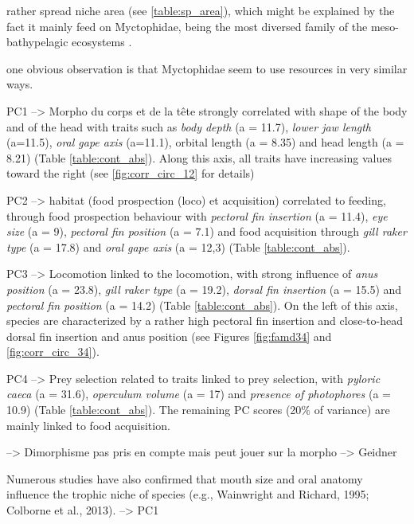 rather spread niche area (see \ref{table:sp_area}), which might be explained by the fact it mainly feed on Myctophidae, being the most diversed family of the meso- bathypelagic ecosystems \citep{garcia2021,sutton1996}.


one obvious observation is that Myctophidae seem to use resources in very similar ways. 

PC1 --> Morpho du corps et de la tête
 strongly correlated with shape of the body and of the head with traits such as \emph{body depth} (a = 11.7), \emph{lower jaw length} (a=11.5), \emph{oral gape axis} (a=11.1), orbital length (a = 8.35) and head length (a = 8.21) (Table \ref{table:cont_abs}). Along this axis, all traits have increasing values toward the right (see \ref{fig:corr_circ_12} for details)

PC2 --> habitat (food prospection (loco) et acquisition)
correlated to feeding, through food prospection behaviour with \emph{pectoral fin insertion} (a = 11.4), \emph{eye size} (a = 9), \emph{pectoral fin position} (a = 7.1) and food acquisition through \emph{gill raker type} (a = 17.8) and \emph{oral gape axis} (a = 12,3) (Table \ref{table:cont_abs}).

PC3 --> Locomotion
linked to the locomotion, with strong influence of \emph{anus position} (a = 23.8), \emph{gill raker type} (a = 19.2), \emph{dorsal fin insertion} (a = 15.5) and \emph{pectoral fin position} (a = 14.2) (Table \ref{table:cont_abs}). On the left of this axis, species are characterized by a rather high pectoral fin insertion and close-to-head dorsal fin insertion and anus position (see Figures \ref{fig:famd34} and \ref{fig:corr_circ_34}).

PC4 --> Prey selection
 related to traits linked to prey selection, with \emph{pyloric caeca} (a = 31.6), \emph{operculum volume} (a = 17) and \emph{presence of photophores} (a = 10.9) (Table \ref{table:cont_abs}). The remaining PC scores (20\% of variance) are mainly linked to food acquisition. 

 --> Dimorphisme pas pris en compte mais peut jouer sur la morpho --> Geidner 




Numerous studies have
also confirmed that mouth size and oral anatomy influence the trophic
niche of species (e.g., Wainwright and Richard, 1995; Colborne et al.,
2013). --> PC1

